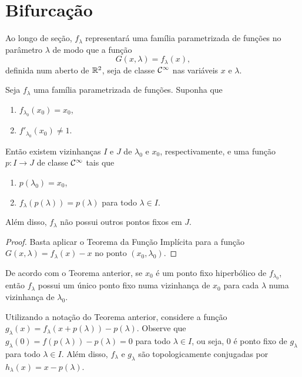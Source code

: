 \section{Bifurcação}

Ao longo de seção, $f_\lambda$ representará uma família parametrizada de funções no parâmetro $\lambda$ de modo que a função
$$G(x, \lambda) = f_\lambda(x),$$
definida num aberto de $\mathbb{R}^2$, seja de classe $\mathcal{C}^\infty$ nas variáveis $x$ e $\lambda$.

\begin{theorem}
\label{theorem1}
Seja $f_\lambda$ uma família parametrizada de funções.
Suponha que
\begin{enumerate}
\item $f_{\lambda_0}(x_0) = x_0$,
\item $f'_{\lambda_0}(x_0) \neq 1$. 
\end{enumerate}
Então existem vizinhanças $I$ e $J$ de $\lambda_0$ e $x_0$, respectivamente, e uma função $p: I \to J$ de classe $\mathcal{C}^\infty$ tais que
\begin{enumerate}
\item $p(\lambda_0) = x_0$, 
\item $f_\lambda(p(\lambda)) = p(\lambda)$ para todo $\lambda \in I$.
\end{enumerate}
Além disso, $f_\lambda$ não possui outros pontos fixos em $J$.
\end{theorem}

\begin{proof}
Basta aplicar o Teorema da Função Implícita para a função $G(x, \lambda) = f_\lambda(x) - x$ no ponto $(x_0, \lambda_0)$.
\end{proof}

De acordo com o Teorema anterior, se $x_0$ é um ponto fixo hiperbólico de $f_{\lambda_0}$, então $f_\lambda$ possui um único ponto fixo numa vizinhança de $x_0$ para cada $\lambda$ numa vizinhança de $\lambda_0$.
 
Utilizando a notação do Teorema anterior, considere a função $g_\lambda(x) = f_\lambda(x + p(\lambda)) - p(\lambda)$. Observe que $g_\lambda(0) = f(p(\lambda)) - p(\lambda) = 0$ para todo $\lambda \in I$, ou seja, $0$ é ponto fixo de $g_\lambda$ para todo $\lambda \in I$. Além disso, $f_\lambda$ e $g_\lambda$ são topologicamente conjugadas por $h_\lambda(x) = x - p(\lambda)$.

